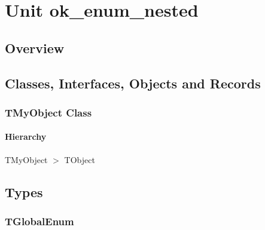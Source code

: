 \documentclass{report}
\newif\ifpdf
\begin{document}
\label{toc}\tableofcontents
\newpage
\newlength{\tmplength}
\chapter{Unit ok{\_}enum{\_}nested}
\label{ok_enum_nested}
\section{Overview}
\begin{description}
\item[\texttt{\begin{ttfamily}TMyObject\end{ttfamily} Class}]
\end{description}
\section{Classes, Interfaces, Objects and Records}
\ifpdf
\subsection*{\large{\textbf{TMyObject Class}}\normalsize\hspace{1ex}\hrulefill}
\else
\subsection*{TMyObject Class}
\fi
\label{ok_enum_nested.TMyObject}
\subsubsection*{\large{\textbf{Hierarchy}}\normalsize\hspace{1ex}\hfill}
TMyObject {$>$} TObject
\section{Types}
\ifpdf
\subsection*{\large{\textbf{TGlobalEnum}}\normalsize\hspace{1ex}\hrulefill}
\else
\end{document}
